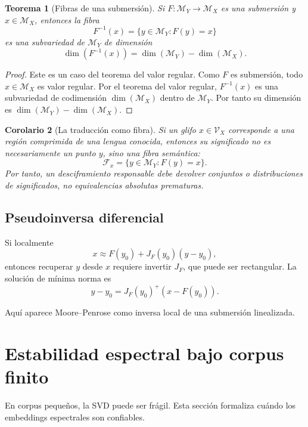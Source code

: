 \documentclass[11pt,a4paper]{article}
\newtheorem{theorem}{Teorema}[section]
\newtheorem{corollary}[theorem]{Corolario}
\newcommand{\1}{\mathbf{1}}
\newcommand{\VX}{\mathcal{V}_X}
\newcommand{\MX}{\mathcal{M}_X}
\newcommand{\MY}{\mathcal{M}_Y}
\numberwithin{equation}{section}
\begin{document}
\begin{theorem}[Fibras de una submersión]
Si \(F:\MY\to\MX\) es una submersión y \(x\in\MX\), entonces la fibra
\[
    F^{-1}(x)=\{y\in\MY:F(y)=x\}
\]
es una subvariedad de \(\MY\) de dimensión
\[
    \dim(F^{-1}(x))=\dim(\MY)-\dim(\MX).
\]
\end{theorem}

\begin{proof}
Este es un caso del teorema del valor regular. Como \(F\) es submersión, todo \(x\in\MX\) es valor regular. Por el teorema del valor regular, \(F^{-1}(x)\) es una subvariedad de codimensión \(\dim(\MX)\) dentro de \(\MY\). Por tanto su dimensión es \(\dim(\MY)-\dim(\MX)\).
\end{proof}

\begin{corollary}[La traducción como fibra]
Si un glifo \(x\in\VX\) corresponde a una región comprimida de una lengua conocida, entonces su significado no es necesariamente un punto \(y\), sino una fibra semántica:
\[
    \mathcal{F}_x
    =
    \{y\in\MY:F(y)=x\}.
\]
Por tanto, un desciframiento responsable debe devolver conjuntos o distribuciones de significados, no equivalencias absolutas prematuras.
\end{corollary}

\subsection{Pseudoinversa diferencial}

Si localmente
\[
    x\approx F(y_0)+J_F(y_0)(y-y_0),
\]
entonces recuperar \(y\) desde \(x\) requiere invertir \(J_F\), que puede ser rectangular. La solución de mínima norma es
\begin{equation}
    y-y_0
    =
    J_F(y_0)^+
    (x-F(y_0)).
\end{equation}

Aquí aparece Moore--Penrose como inversa local de una submersión linealizada.

\section{Estabilidad espectral bajo corpus finito}
\label{sec:spectral_stability}

En corpus pequeños, la SVD puede ser frágil. Esta sección formaliza cuándo los embeddings espectrales son confiables.
\end{document}
